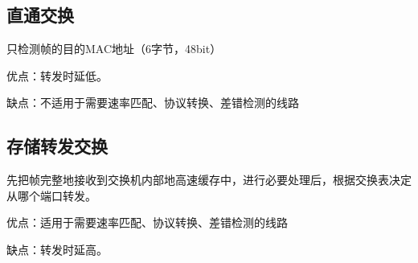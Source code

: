 \subsection{直通交换}
只检测帧的目的MAC地址（6字节，48bit）

优点：转发时延低。

缺点：不适用于需要速率匹配、协议转换、差错检测的线路


\subsection{存储转发交换}
先把帧完整地接收到交换机内部地高速缓存中，进行必要处理后，根据交换表决定从哪个端口转发。

优点：适用于需要速率匹配、协议转换、差错检测的线路

缺点：转发时延高。


